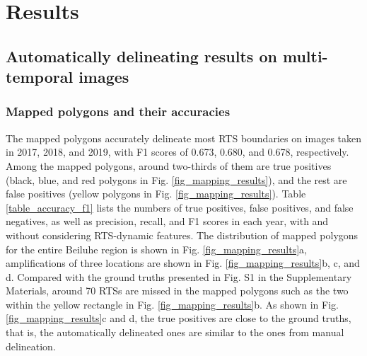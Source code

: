 \documentclass[authoryear,preprint,review,12pt]{elsarticle}
\begin{document}
\section{Results}
\label{sec_result}


\subsection{Automatically delineating results on multi-temporal images}
\label{sec_result_auto_deliea}


\subsubsection{Mapped polygons and their accuracies} %
\label{sec_mapped_polygons}

The mapped polygons accurately delineate most RTS boundaries on images taken in 2017, 2018, and 2019, with F1 scores of 0.673, 0.680, and 0.678, respectively.
Among the mapped polygons, around two-thirds of them are true positives (black, blue, and red polygons in Fig. \ref{fig_mapping_results}), and the rest are false positives (yellow polygons in Fig. \ref{fig_mapping_results}). 
Table \ref{table_accuracy_f1} lists the numbers of true positives, false positives, and false negatives, as well as precision, recall, and F1 scores in each year, with and without considering RTS-dynamic features.
The distribution of mapped polygons for the entire Beiluhe region is shown in Fig. \ref{fig_mapping_results}a, amplifications of three locations are shown in Fig. \ref{fig_mapping_results}b, c, and d. 
Compared with the ground truths presented in Fig. S1 in the Supplementary Materials,  around 70 RTSs are missed in the mapped polygons such as the two within the yellow rectangle in Fig. \ref{fig_mapping_results}b.
As shown in Fig. \ref{fig_mapping_results}c and d, the true positives are close to the ground truths, that is, the automatically delineated ones are similar to the ones from manual delineation. 
\end{document}
